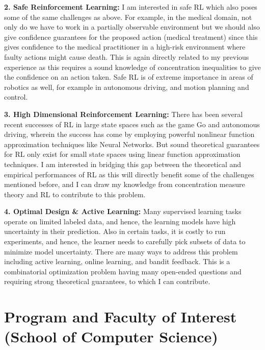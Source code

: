 \documentclass{article}
\begin{document}
\textbf{2. Safe Reinforcement Learning:} I am interested in safe RL which also poses some of the same challenges as above. For example, in the medical domain, not only do we have to work in a partially observable environment but we should also give confidence guarantees for the proposed action (medical treatment) since this gives confidence to the medical
practitioner in a high-risk environment where faulty actions might cause death. This is again directly related to my previous experience as this requires a sound knowledge of concentration inequalities to give the confidence on an action taken. Safe RL is of extreme importance in areas of robotics as well, for example in autonomous driving,
and motion planning and control.


\textbf{3. High Dimensional Reinforcement Learning:} There has been several recent successes of RL in large state spaces such as the game Go and autonomous driving, wherein the success has come by employing powerful nonlinear function approximation techniques like Neural Networks. But sound theoretical guarantees for RL only exist
for small state spaces using linear function approximation techniques. I am interested in bridging this gap between the theoretical and empirical performances of RL as this will directly benefit some of the challenges mentioned before, and I can draw my knowledge from concentration measure theory and RL to contribute to this problem.


\textbf{4. Optimal Design \& Active Learning:} Many supervised learning tasks operate on limited labeled data, and hence, the learning models have high uncertainty in their prediction. Also in certain tasks, it is costly to run experiments, and hence, the learner needs to carefully pick subsets of data to minimize model uncertainty. There are many ways to address this problem including active learning, online learning, and bandit feedback. This is a combinatorial optimization problem having many open-ended questions and requiring strong theoretical guarantees, to which I can contribute.

\vspace*{-2em}
\section{Program and Faculty of Interest (School of Computer Science)}
\vspace*{-1em}
\end{document}
